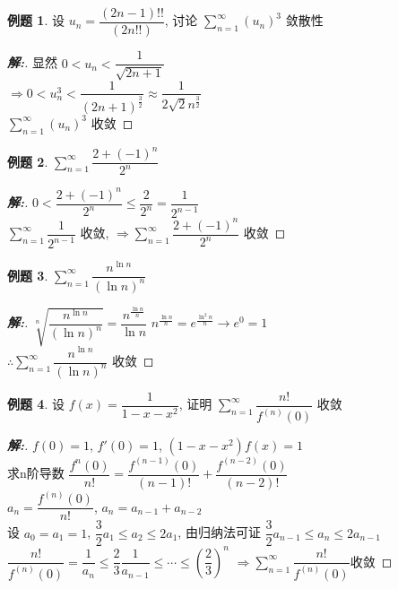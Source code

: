 \documentclass[12pt,a4paper]{ctexart}
\newenvironment{solution}{\begin{proof}[\hspace{2em}\textbf{解:}]}{\end{proof}}
\theoremstyle{definition}%
\newtheorem{exercise}{\hspace{2em}例题}
\begin{document}
\begin{exercise}
	设 $ u_n=\dfrac{(2n-1)!!}{(2n!!)} $, 讨论 $ \displaystyle\sum_{n=1}^{\infty}(u_n)^3 $ 敛散性
\end{exercise}
\begin{solution}
	显然 $ 0 < u_n < \dfrac{1}{\sqrt{2n+1}} $\\
	
	$ \Rightarrow 0 < u_n^3 < \dfrac{1}{(2n+1)^{\frac{3}{2}}}
	\approx \dfrac{1}{2\sqrt{2}n^{\frac{3}{2}}} $\\
	
	$ \displaystyle\sum_{n=1}^{\infty}(u_n)^3 $ 收敛
\end{solution}

\begin{exercise}
	$ \displaystyle\sum_{n=1}^{\infty}\dfrac{2+(-1)^n}{2^n} $
\end{exercise}
\begin{solution}
	$ 0 < \dfrac{2+(-1)^n}{2^n} \le \dfrac{2}{2^n} = \dfrac{1}{2^{n-1}} $\\
	
	$ \displaystyle\sum_{n=1}^{\infty}\dfrac{1}{2^{n-1}} $ 收敛,
	$ \Rightarrow \displaystyle\sum_{n=1}^{\infty}\dfrac{2+(-1)^n}{2^n} $ 收敛
\end{solution}

\begin{exercise}
	$ \displaystyle\sum_{n=1}^{\infty}\dfrac{n^{\ln n}}{(\ln n)^n} $
\end{exercise}
\begin{solution}
	$ \sqrt[n]{\dfrac{n^{\ln n}}{(\ln n)^n}}=\dfrac{n^{\frac{\ln n}{n}}}{\ln n} $
	$ n^{\frac{\ln n}{n}}=e^{\tfrac{\ln^2 n}{n}} \to e^0=1$\\
	
	$ \therefore\displaystyle\sum_{n=1}^{\infty}\dfrac{n^{\ln n}}{(\ln n)^n} $ 收敛
\end{solution}

\begin{exercise}
	设 $ f(x)=\dfrac{1}{1-x-x^2} $, 证明 $ \displaystyle\sum_{n=1}^{\infty}\dfrac{n!}{f^{(n)}(0)} $ 收敛
\end{exercise}
\begin{solution}
	$ f(0)=1 $, $ f'(0)=1 $, $ (1-x-x^2)f(x)=1 $\\
	
	求n阶导数 $ \dfrac{f^{{n}}(0)}{n!}=\dfrac{f^{(n-1)}(0)}{(n-1)!}+\dfrac{f^{(n-2)}(0)}{(n-2)!} $\\
	
	$ a_n=\dfrac{f^{(n)}(0)}{n!} $, $ a_n=a_{n-1}+a_{n-2} $\\
	
	设 $ a_0=a_1=1 $, $ \dfrac{3}{2}a_1 \le a_2 \le 2a_1 $, 由归纳法可证 $ \dfrac{3}{2}a_{n-1} \le a_n \le 2a_{n-1} $\\
	
	$ \dfrac{n!}{f^{(n)}(0)}=\dfrac{1}{a_n} \le \dfrac{2}{3}\dfrac{1}{a_{n-1}} \le \cdots \le (\dfrac{2}{3})^n $
	$ \Rightarrow \displaystyle\sum_{n=1}^{\infty} \dfrac{n!}{f^{(n)}(0)} $收敛
\end{solution}
\end{document}
